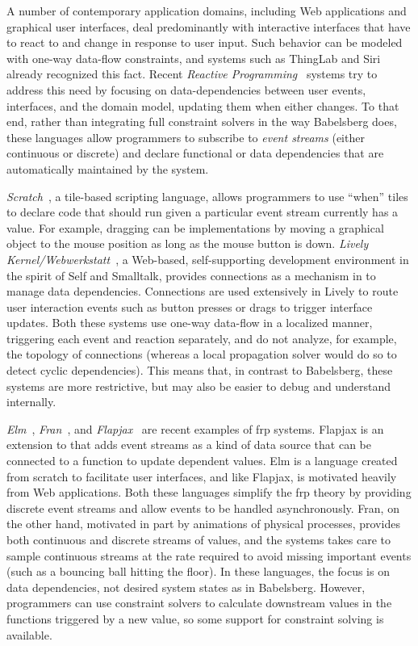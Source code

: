 A number of contemporary application domains, including Web applications and
graphical user interfaces, deal predominantly with interactive interfaces that
have to react to and change in response to user input. Such behavior can be
modeled with one-way data-flow constraints, and systems such as ThingLab and
Siri already recognized this fact. Recent \emph{Reactive
  Programming}~\cite{caromel1996reactive,boussinot1996reactive} systems try to
address this need by focusing on data-dependencies between user events,
interfaces, and the domain model, updating them when either changes. To that
end, rather than integrating full constraint solvers in the way Babelsberg does,
these languages allow programmers to subscribe to \emph{event streams} (either
continuous or discrete) and declare functional or data dependencies that are
automatically maintained by the system.

\emph{Scratch}~\cite{resnick2009scratch}, a tile-based scripting language,
allows programmers to use ``when'' tiles to declare code that should run given a
particular event stream currently has a value. For example, dragging can be
implementations by moving a graphical object to the mouse position as long as
the mouse button is
down. \emph{Lively Kernel/Webwerkstatt}~\cite{lively-partsbin-2012}, a Web-based,
self-supporting development environment in the spirit of Self and Smalltalk,
provides connections as a mechanism in \javascript to manage data
dependencies. Connections are used extensively in Lively to route user
interaction events such as button presses or drags to trigger interface
updates. Both these systems use one-way data-flow in a localized manner,
triggering each event and reaction separately, and do not analyze, for example,
the topology of connections (whereas a local propagation solver would do so to
detect cyclic dependencies). This means that, in contrast to Babelsberg, these
systems are more restrictive, but may also be easier to debug and understand
internally.

\emph{Elm}~\cite{czaplicki2013asynchronous},
\emph{Fran}~\cite{elliott:1997:fran}, and
\emph{Flapjax}~\cite{meyerovich2009flapjax} are recent examples of \ac{frp}
systems. Flapjax is an extension to \javascript that adds event streams as a
kind of data source that can be connected to a function to update dependent
values. Elm is a language created from scratch to facilitate user interfaces,
and like Flapjax, is motivated heavily from \javascript Web applications. Both
these languages simplify the \ac{frp} theory by providing discrete event streams
and allow events to be handled asynchronously. Fran, on the other hand,
motivated in part by animations of physical processes, provides both continuous
and discrete streams of values, and the systems takes care to sample continuous
streams at the rate required to avoid missing important events (such as a
bouncing ball hitting the floor). In these languages, the focus is on data
dependencies, not desired system states as in Babelsberg. However, programmers
can use constraint solvers to calculate downstream values in the functions
triggered by a new value, so some support for constraint solving is available.


